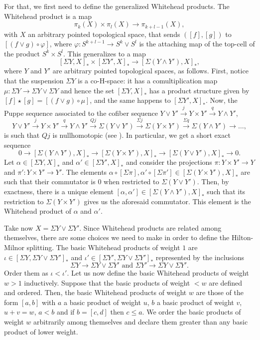 \documentclass[a4paper, 11pt,reqno]{amsart}
\theoremstyle{plain}
\theoremstyle{definition}
\begin{document}
For that, we first need to define the generalized Whitehead products. The Whitehead product is a map
\[\pi_k(X)\times\pi_l(X)\to\pi_{k+l-1}(X),\]
with $X$ an arbitrary pointed topological space, 
that sends $([f],[g])$ to $[(f\vee g)\circ\varphi]$, where 
$\varphi\colon S^{k+l-1}\to S^k\vee S^l$ is the attaching map of the top-cell of the product $S^k\times S^l$. This generalizes to a map
\[[\Sigma Y,X]_\ast\times[\Sigma Y',X]_\ast\to[\Sigma(Y\wedge Y'),X]_\ast,\]
where $Y$ and $Y'$ are arbitrary pointed topological spaces, as follows. First, notice that the suspension $\Sigma Y$ is a co-H-space: it has a comultiplication map $\mu\colon \Sigma Y\to \Sigma Y\vee \Sigma Y$ and hence the set $[\Sigma Y, X]_\ast$ has a product structure given by $[f]\star[g]=[(f\vee g)\circ\mu]$, and the same happens to $[\Sigma Y',X]_\ast$. Now, the Puppe sequence associated to the cofiber sequence $Y\vee Y'\stackrel{j}{\to} Y\times Y'\stackrel{q}{\to} Y\wedge Y'$,
\[Y\vee Y'\stackrel{j}{\to} Y\times Y'\stackrel{q}{\to} Y\wedge Y'\stackrel{Qj}{\to} \Sigma(Y\vee Y') \stackrel{\Sigma j}{\to} \Sigma(Y\times Y')\stackrel{\Sigma q}{\to} \Sigma(Y\wedge Y')\to\ldots, \]
is such that $Qj$ is nullhomotopic (see \cite{puppe}). In particular, we get a short exact sequence
\[0\to[\Sigma(Y\wedge Y'),X]_\ast\to[\Sigma(Y\times Y'),X]_\ast\to[\Sigma(Y\vee Y'), X]_\ast\to0.\]
Let $\alpha\in[\Sigma Y,X]_\ast$ and $\alpha'\in[\Sigma Y',X]_\ast$ and consider the projections $\pi\colon Y\times Y'\to Y$ and $\pi'\colon Y\times Y'\to Y'$. The elements $\alpha\circ[\Sigma\pi], \alpha'\circ[\Sigma\pi']\in[\Sigma(Y\times Y'), X]_\ast$ are such that their commutator is $0$ when restricted to $\Sigma(Y\vee Y')$. Then, by exactness, there is a unique element $[\alpha,\alpha']\in[\Sigma(Y\wedge Y'),X]_\ast$ such that its restriction to $\Sigma(Y\times Y')$ gives us the aforesaid commutator. This element is the Whitehead product of $\alpha$ and $\alpha'$.\par
Take now $X=\Sigma Y\vee \Sigma Y'$. Since Whitehead products are related among themselves, there are some choices we need to make in order to define the Hilton-Milnor splitting. The basic Whitehead products of weight $1$ are $\iota\in[\Sigma Y,\Sigma Y\vee \Sigma Y']_\ast$ and $\iota'\in[\Sigma Y',\Sigma Y\vee \Sigma Y']_\ast$ represented by the inclusions
\[\Sigma Y\to \Sigma Y\vee \Sigma Y'\text{ and }\Sigma Y'\to\Sigma Y\vee\Sigma Y'.\]
Order them as $\iota<\iota'$. Let us now define the basic Whitehead products of weight $w>1$ inductively. Suppose that the basic products of weight $<w$ are defined and ordered. Then, the basic Whitehead products of weight $w$ are those of the form $[a,b]$ with $a$ a basic product of weight $u$, $b$ a basic product of weight $v$, $u+v=w$, $a<b$ and if $b=[c,d]$ then $c\leq a$. We order the basic products of weight $w$ arbitrarily among themselves and declare them greater than any basic product of lower weight.\par
\end{document}
